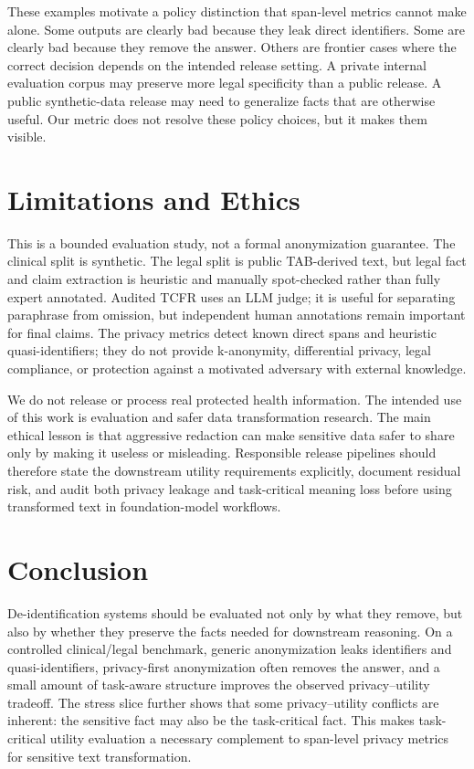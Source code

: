 \documentclass{article}
\newcommand{\tcfr}{TCFR}
\begin{document}
These examples motivate a policy distinction that span-level metrics cannot make
alone.  Some outputs are clearly bad because they leak direct identifiers.  Some
are clearly bad because they remove the answer.  Others are frontier cases where
the correct decision depends on the intended release setting.  A private internal
evaluation corpus may preserve more legal specificity than a public release.  A
public synthetic-data release may need to generalize facts that are otherwise
useful.  Our metric does not resolve these policy choices, but it makes them
visible.

\section{Limitations and Ethics}

This is a bounded evaluation study, not a formal anonymization guarantee.  The
clinical split is synthetic.  The legal split is public TAB-derived text, but
legal fact and claim extraction is heuristic and manually spot-checked rather
than fully expert annotated.  Audited \tcfr{} uses an LLM judge; it is useful for
separating paraphrase from omission, but independent human annotations remain
important for final claims.  The privacy metrics detect known direct spans and
heuristic quasi-identifiers; they do not provide k-anonymity, differential
privacy, legal compliance, or protection against a motivated adversary with
external knowledge.

We do not release or process real protected health information.  The intended use
of this work is evaluation and safer data transformation research.  The main
ethical lesson is that aggressive redaction can make sensitive data safer to
share only by making it useless or misleading.  Responsible release pipelines
should therefore state the downstream utility requirements explicitly, document
residual risk, and audit both privacy leakage and task-critical meaning loss
before using transformed text in foundation-model workflows.

\section{Conclusion}

De-identification systems should be evaluated not only by what they remove, but
also by whether they preserve the facts needed for downstream reasoning.  On a
controlled clinical/legal benchmark, generic anonymization leaks identifiers and
quasi-identifiers, privacy-first anonymization often removes the answer, and a
small amount of task-aware structure improves the observed privacy--utility
tradeoff.  The stress slice further shows that some privacy--utility conflicts
are inherent: the sensitive fact may also be the task-critical fact.  This makes
task-critical utility evaluation a necessary complement to span-level privacy
metrics for sensitive text transformation.



\end{document}
